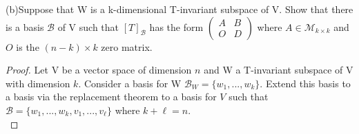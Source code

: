 \documentclass[a4paper, 11pt]{article}
\newenvironment{solution}{%
	\begin{list}{}{%
			\setlength{\topsep}{0pt}%
			\setlength{\leftmargin}{1.5cm}%
			\setlength{\rightmargin}{1.5cm}%
			\setlength{\listparindent}{\parindent}%
			\setlength{\itemindent}{\parindent}%
			\setlength{\parsep}{\parskip}%
		}%
		\item[]}{\end{list}}
\begin{document}
\noindent(b)Suppose that W is a k-dimensional T-invariant subspace of V. Show that there is a basis $\mathcal{B}$ of V such that $[T]_\mathcal{B}$ has the form $\begin{pmatrix}
A & B \\ O & D
\end{pmatrix}$ where $A\in\mathcal{M}_{k\times k}$ and $O$ is the $(n-k)\times k$ zero matrix. \\
	\begin{solution}
		\begin{proof}
			\noindent Let V be a vector space of dimension $n$ and W a T-invariant subspace of V with dimension $k$. Consider a basis for W $\mathcal{B}_W = \{w_1,...,w_k\}$. Extend this basis to a basis via the replacement theorem to a basis for $V$ such that $\mathcal{B}= \{w_1,...,w_k, v_1,..., v_\ell\}$ where $k+\ell = n$. \\ 
			

\end{proof}
\end{solution}
\end{document}
